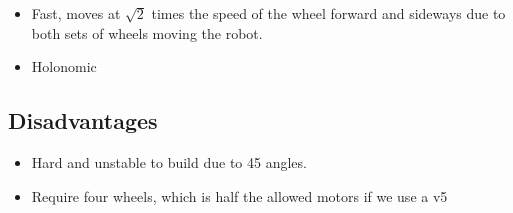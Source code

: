 \documentclass[../../main.tex]{subfiles}
\begin{document}
\begin{itemize}
    \item Fast, moves at $\sqrt{2}$ times the speed of the wheel forward and sideways due to
          both sets of wheels moving the robot.
    \item Holonomic

\end{itemize}


\subsection{Disadvantages}

\begin{itemize}
    \item Hard and unstable to build due to 45 \degree angles.
    \item Require four wheels, which is half the allowed motors
          if we use a v5
\end{itemize}
\end{document}
